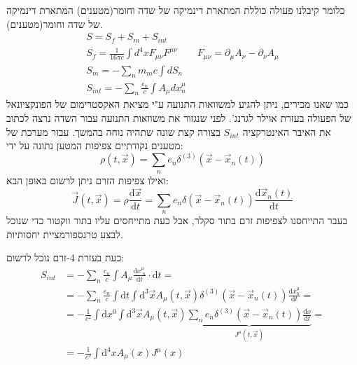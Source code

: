 \documentclass{tstextbook}
\begin{document}
כלומר קיבלנו פעולה כוללת המתארת דינמיקה של שדה וחומר(מטענים) המתארת דינמיקה של שדה וחומר(מטענים).
$$\begin{gather}S=S_{f}+S_{m}+S_{int}  \\S_{f}=\frac{1}{16\pi c}\int d^4x F_{\mu \nu}F^{\mu \nu} \qquad  F_{\mu \nu}=\partial_{\mu}A_{\nu}-\partial_{\nu}A_{\mu}\\S_{m}=-\sum_{n}m_{m}c\int dS_{n} \\S_{int} = - \sum_{n} \frac{e_{n}}{c}\int A_{\mu} dx^\mu_{n}
\end{gather}$$
כמו שאנו מכירים, ניתן להגיע למשוואות התנועה ע"י מציאת האקסטרימום של הפונקציונאל של הפעולה בעזרת אוילר לגרנג'. לפני שנגזור את משוואות התנועה עבור השדה נרצה לכתוב את האיבר האינטרקציה \(S_{int}\) בצורה קצת שונה שתהיה נוחה בהמשך. עבור מערכת של מטענים נקודתיים צפיפות המטען נתונה על ידי:
$$\rho\left( t,\vec{x} \right)=\sum_{n} e_{n}\delta^{(3)}\left( \vec{x}-\vec{x}_{n}(t) \right)$$
ואילו צפיפות הזרם ניתן לרשום באופן הבא:
$$\vec{J}\left( t,\vec{x} \right)=\rho\frac{ \mathrm{d}\vec{x}}{\mathrm{d}t}=\sum_{n} e_{n}\delta\left( \vec{x}-\vec{x}_{n}(t) \right) \frac{\mathrm{d}\vec{x}_{n}(t)}{\mathrm{d}t}$$
בעבר התייחסנו לצפיפות זרם בתור סקלר, אבל כעת מתייחסים עליו בתור ווקטור כדי שנוכל לבצע טרנספורמציית יחסותיות.

כעת בעזרת 4-זרם נוכל לרשום:
$$\begin{align}S_{int}&=-\sum_{n} \frac{e_{n}}{c}\int A_{\mu} \frac{\mathrm{d}x^\mu_{\;n}}{\mathrm{d}t} \cdot \mathrm{d}t= \\&=-\sum_{n} \frac{e_{n}}{c}\int \mathrm{d}t \int\mathrm{d}^3 \vec{x}A_{\mu}\left( t,\vec{x} \right)\delta^{(3)}\left( \vec{x}-\vec{x}_{n}(t) \right) \frac{\mathrm{d}x^\mu_{n}}{\mathrm{d}t} = \\&=-\frac{1}{c^2} \int \mathrm{d}x^0 \int \mathrm{d}^3\vec{x} A_{\mu}\left( t,\vec{x} \right)\underbrace{ \sum_{n} e_{n}\delta^{(3)}\left( \vec{x}-\vec{x}_{n}(t) \right) \frac{\mathrm{d}x}{\mathrm{d}t} }_{ J^\mu\left( t,\vec{x} \right) }= \\&=-\frac{1}{c^2}\int \mathrm{d}^4 x A_{\mu}(x) J^\mu(x) 
\end{align}$$
\end{document}

